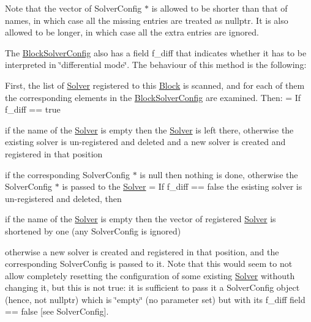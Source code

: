 Note that the vector of Solver\+Config $\ast$ is allowed to be shorter than that of names, in which case all the missing entries are treated as nullptr. It is also allowed to be longer, in which case all the extra entries are ignored.

The \mbox{\hyperlink{class_s_m_spp__di__unipi__it_1_1_block_solver_config}{Block\+Solver\+Config}} also has a field f\+\_\+diff that indicates whether it has to be interpreted in \char`\"{}differential mode\char`\"{}. The behaviour of this method is the following\+:


\begin{DoxyItemize}
\item First, the list of \mbox{\hyperlink{class_s_m_spp__di__unipi__it_1_1_solver}{Solver}} registered to this \mbox{\hyperlink{class_s_m_spp__di__unipi__it_1_1_block}{Block}} is scanned, and for each of them the corresponding elements in the \mbox{\hyperlink{class_s_m_spp__di__unipi__it_1_1_block_solver_config}{Block\+Solver\+Config}} are examined. Then\+: = If f\+\_\+diff == true
\begin{DoxyItemize}
\item if the name of the \mbox{\hyperlink{class_s_m_spp__di__unipi__it_1_1_solver}{Solver}} is empty then the \mbox{\hyperlink{class_s_m_spp__di__unipi__it_1_1_solver}{Solver}} is left there, otherwise the existing solver is un-\/registered and deleted and a new solver is created and registered in that position
\item if the corresponding Solver\+Config $\ast$ is null then nothing is done, otherwise the Solver\+Config $\ast$ is passed to the \mbox{\hyperlink{class_s_m_spp__di__unipi__it_1_1_solver}{Solver}} = If f\+\_\+diff == false the esisting solver is un-\/registered and deleted, then
\item if the name of the \mbox{\hyperlink{class_s_m_spp__di__unipi__it_1_1_solver}{Solver}} is empty then the vector of registered \mbox{\hyperlink{class_s_m_spp__di__unipi__it_1_1_solver}{Solver}} is shortened by one (any Solver\+Config is ignored)
\item otherwise a new solver is created and registered in that position, and the corresponding Solver\+Config is passed to it. Note that this would seem to not allow completely resetting the configuration of some existing \mbox{\hyperlink{class_s_m_spp__di__unipi__it_1_1_solver}{Solver}} withouth changing it, but this is not true\+: it is sufficient to pass it a Solver\+Config object (hence, not nullptr) which is \char`\"{}empty\char`\"{} (no parameter set) but with its f\+\_\+diff field == false \mbox{[}see Solver\+Config\mbox{]}.

\end{DoxyItemize}
\end{DoxyItemize}
